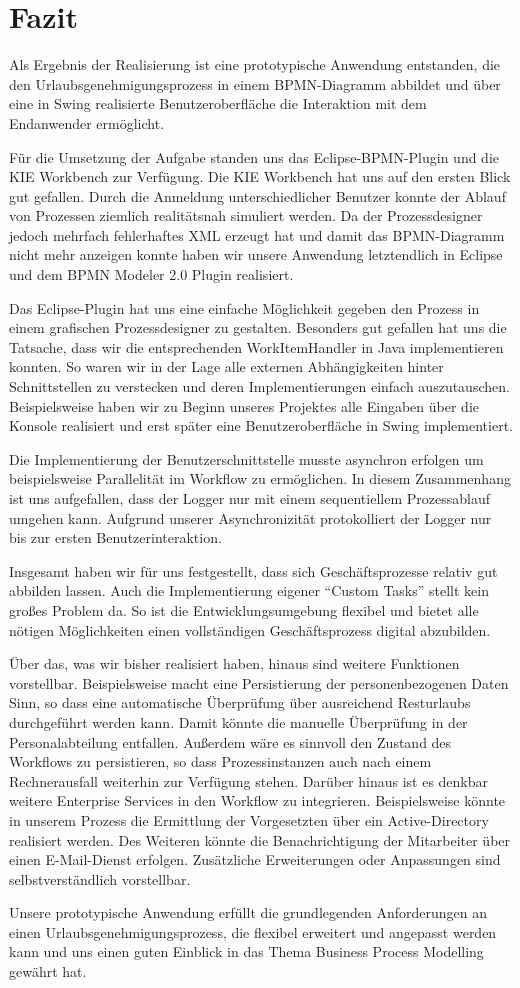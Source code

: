 \section{Fazit}
Als Ergebnis der Realisierung ist eine prototypische Anwendung entstanden, die den Urlaubsgenehmigungsprozess in einem BPMN-Diagramm abbildet und über eine in Swing realisierte Benutzeroberfläche die Interaktion mit dem Endanwender ermöglicht.

Für die Umsetzung der Aufgabe standen uns das Eclipse-BPMN-Plugin und die KIE Workbench zur Verfügung. Die KIE Workbench hat uns auf den ersten Blick gut gefallen. Durch die Anmeldung unterschiedlicher Benutzer konnte der Ablauf von Prozessen ziemlich realitätsnah simuliert werden. Da der Prozessdesigner jedoch mehrfach fehlerhaftes XML erzeugt hat und damit das BPMN-Diagramm nicht mehr anzeigen konnte haben wir unsere Anwendung letztendlich in Eclipse und dem BPMN Modeler 2.0 Plugin realisiert.

Das Eclipse-Plugin hat uns eine einfache Möglichkeit gegeben den Prozess in einem grafischen Prozessdesigner zu gestalten. Besonders gut gefallen hat uns die Tatsache, dass wir die entsprechenden WorkItemHandler in Java implementieren konnten. So waren wir in der Lage alle externen Abhängigkeiten hinter Schnittstellen zu verstecken und deren Implementierungen einfach auszutauschen. Beispielsweise haben wir zu Beginn unseres Projektes alle Eingaben über die Konsole realisiert und erst später eine Benutzeroberfläche in Swing implementiert.

Die Implementierung der Benutzerschnittstelle musste asynchron erfolgen um beispielsweise Parallelität im Workflow zu ermöglichen. In diesem Zusammenhang ist uns aufgefallen, dass der Logger nur mit einem sequentiellem Prozessablauf umgehen kann. Aufgrund unserer Asynchronizität protokolliert der Logger nur bis zur ersten Benutzerinteraktion.

Insgesamt haben wir für uns festgestellt, dass sich Geschäftsprozesse relativ gut abbilden lassen. Auch die Implementierung eigener "`Custom Tasks"' stellt kein großes Problem da. So ist die Entwicklungsumgebung flexibel und bietet alle nötigen Möglichkeiten einen vollständigen Geschäftsprozess digital abzubilden.

Über das, was wir bisher realisiert haben, hinaus sind weitere Funktionen vorstellbar. Beispielsweise macht eine Persistierung der personenbezogenen Daten Sinn, so dass eine automatische Überprüfung über ausreichend Resturlaubs durchgeführt werden kann. Damit könnte die manuelle Überprüfung in der Personalabteilung entfallen. Außerdem wäre es sinnvoll den Zustand des Workflows zu persistieren, so dass Prozessinstanzen auch nach einem Rechnerausfall weiterhin zur Verfügung stehen. Darüber hinaus ist es denkbar weitere Enterprise Services in den Workflow zu integrieren. Beispielsweise könnte in unserem Prozess die Ermittlung der Vorgesetzten über ein Active-Directory realisiert werden. Des Weiteren könnte die Benachrichtigung der Mitarbeiter über einen E-Mail-Dienst erfolgen. Zusätzliche Erweiterungen oder Anpassungen sind selbstverständlich vorstellbar.

Unsere prototypische Anwendung erfüllt die grundlegenden Anforderungen an einen Urlaubsgenehmigungsprozess, die flexibel erweitert und angepasst werden kann und uns einen guten Einblick in das Thema Business Process Modelling gewährt hat.